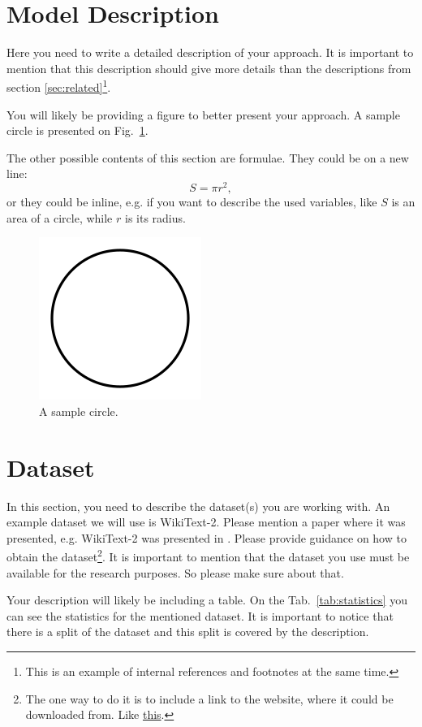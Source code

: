 \documentclass{article}
\begin{document}
\section{Model Description}
Here you need to write a detailed description of your approach. It is important to mention that this description should give more details than the descriptions from section \ref{sec:related}\footnote{This is an example of internal references and footnotes at the same time.}. 

You will likely be providing a figure to better present your approach. A sample circle is presented on Fig.~\ref{fig:circle}.

The other possible contents of this section are formulae. They could be on a new line:
$$S=\pi r^2,$$
or they could be inline, e.g. if you want to describe the used variables, like $S$ is an area of a circle, while $r$ is its radius. 

\begin{figure}[!tbh]
    \centering
    \includegraphics[width=0.3\linewidth]{circle.png}
    \caption{A sample circle.}
    \label{fig:circle}
\end{figure}

\section{Dataset}
In this section, you need to describe the dataset(s) you are working with. 
An example dataset we will use is WikiText-2. Please mention a paper where it was presented, e.g. WikiText-2 was presented in \cite{merity2017pointer}. Please provide guidance on how to obtain the dataset\footnote{The one way to do it is to include a link to the website, where it could be downloaded from. Like \href{https://blog.einstein.ai/the-wikitext-long-term-dependency-language-modeling-dataset/}{this}.}. It is important to mention that the dataset you use must be available for the research purposes. So please make sure about that.

Your description will likely be including a table. On the Tab.~\ref{tab:statistics} you can see the statistics for the mentioned dataset. It is important to notice that there is a split of the dataset and this split is covered by the description.
\end{document}
